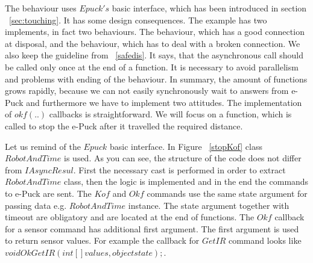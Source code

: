   The behaviour  uses $Epuck's$ basic interface,	which has been introduced in section ~\ref{sec:touching}.
  It has some design consequences. The example has two implements, in fact two behaviours. 
  The behaviour, which has a good connection at disposal,
  and the behaviour, which has to deal with a broken connection.
  We also keep the guideline from ~\ref{safedis}. 
  It says, that the asynchronous call should be called only once at the end of a function.
  It is necessary to avoid parallelism and problems with ending of the behaviour.
  In summary, the amount of functions grows rapidly, because we can not easily synchronously wait to answers from e-Puck
  and furthermore we have to implement two attitudes.
  The implementation of $okf(..)$ callbacks is straightforward. 
  We will focus on a function, which is called to stop the e-Puck after it travelled the required distance.

  Let us remind of the $Epuck$ basic interface.
  In Figure ~\ref{stopKof} class $RobotAndTime$ is used. 
  As you can see, the structure of the code does not differ from $IAsyncResul$. First the necessary cast is performed in order to 
  extract $RobotAndTime$ class, then the logic is implemented and in the end the commands to e-Puck are sent.
  The $Kof$ and $Okf$ commands use the same state argument for passing data e.g. $RobotAndTime$ instance. The state argument together 
  with timeout are obligatory and are located at the end of functions.
  The $Okf$ callback for a sensor command has additional first argument. 
  The first argument is used to return sensor values. For example
  the callback for $GetIR$ command looks like $void OkGetIR(int[] values, object state);$.
  
